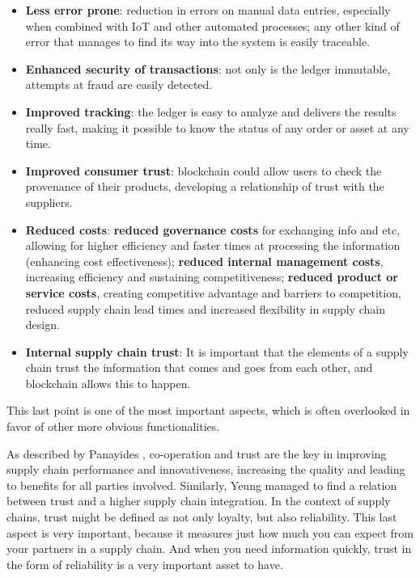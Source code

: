 \begin{itemize}
\item \textbf{Less error prone}: reduction in errors on manual data entries, especially when combined with IoT and other automated processes; any other kind of error that manages to find its way into the system is easily traceable.
\item \textbf{Enhanced security of transactions}: not only is the ledger immutable, attempts at fraud are easily detected.
\item \textbf{Improved tracking}: the ledger is easy to analyze and delivers the results really fast, making it possible to know the status of any order or asset at any time.
\item \textbf{Improved consumer trust}: blockchain could allow users to check the provenance of their products, developing a relationship of trust with the suppliers.
\item \textbf{Reduced costs}: \textbf{reduced governance costs} for exchanging info and etc, allowing for higher efficiency and faster times at processing the information (enhancing cost effectiveness); \textbf{reduced internal management costs}, increasing efficiency and sustaining competitiveness; \textbf{reduced product or service costs}, creating competitive advantage and barriers to competition, reduced supply chain lead times and increased flexibility in supply chain design. %
\item \textbf{Internal supply chain trust}: It is important that the elements of a supply chain trust the information that comes and goes from each other, and blockchain allows this to happen.

\end{itemize}


This last point is one of the most important aspects, which is often overlooked in favor of other more obvious functionalities.

As described by Panayides \cite{Panayides2009}, co-operation and trust are the key in improving supply chain performance and innovativeness, increasing the quality and leading to benefits for all parties involved. Similarly, Yeung \cite{Yeung2009} managed to find a relation between trust and a higher supply chain integration. In the context of supply chains, trust might be defined as not only loyalty, but also reliability. This last aspect is very important, because it measures just how much you can expect from your partners in a supply chain. And when you need information quickly, trust in the form of reliability is a very important asset to have.

